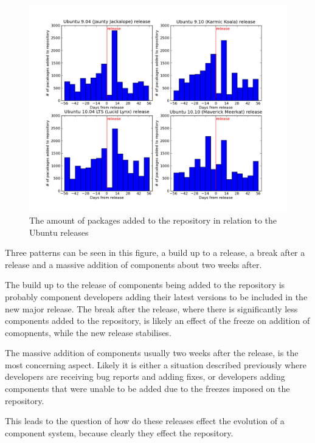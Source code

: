 \begin{figure}[htp]
\begin{center}
  \includegraphics[width=\textwidth]{ubuntusimulationpics/releasedatepacakges}
  \caption[labelInTOC]{The amount of packages added to the repository in relation to the Ubuntu releases}
  \label{ubuntureleases}
\end{center}
\end{figure}

Three patterns can be seen in this figure, a build up to a release, a break after a release and a massive addition of components about two weeks after.

The build up to the release of components being added to the repository is probably component developers adding their latest versions to be included in the new major release.
The break after the release, where there is significantly less components added to the repository, is likely an effect of the freeze on addition of comopnents, while the new release stabilises.

The massive addition of components usually two weeks after the release, is the most concerning aspect.
Likely it is either a situation described previously where developers are receiving bug reports and adding fixes, 
or developers adding components that were unable to be added due to the freezes imposed on the repository. 

This leads to the question of how do these releases effect the evolution of a component system, because clearly they effect the repository.

